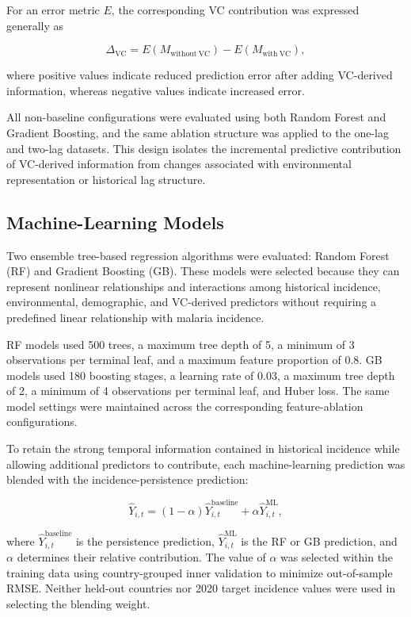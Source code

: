 \documentclass[10pt,twocolumn]{article}
\begin{document}
For an error metric \(E\), the corresponding VC contribution was
expressed generally as

\begin{equation}
\Delta_{\mathrm{VC}}
=
E(M_{\mathrm{without\ VC}})
-
E(M_{\mathrm{with\ VC}}),
\label{eq:vc_increment}
\end{equation}

where positive values indicate reduced prediction error after adding
VC-derived information, whereas negative values indicate increased
error.

All non-baseline configurations were evaluated using both Random
Forest and Gradient Boosting, and the same ablation structure was
applied to the one-lag and two-lag datasets. This design isolates the
incremental predictive contribution of VC-derived information from
changes associated with environmental representation or historical
lag structure.

\subsection{Machine-Learning Models}

Two ensemble tree-based regression algorithms were evaluated: Random
Forest (RF) and Gradient Boosting (GB). These models were selected
because they can represent nonlinear relationships and interactions
among historical incidence, environmental, demographic, and VC-derived
predictors without requiring a predefined linear relationship with
malaria incidence.

RF models used 500 trees, a maximum tree depth of 5, a minimum of 3
observations per terminal leaf, and a maximum feature proportion of
0.8. GB models used 180 boosting stages, a learning rate of 0.03, a
maximum tree depth of 2, a minimum of 4 observations per terminal leaf,
and Huber loss. The same model settings were maintained across the
corresponding feature-ablation configurations.

To retain the strong temporal information contained in historical
incidence while allowing additional predictors to contribute, each
machine-learning prediction was blended with the incidence-persistence
prediction:

\begin{equation}
\hat{Y}_{i,t}
=
(1-\alpha)\hat{Y}^{\mathrm{baseline}}_{i,t}
+
\alpha\hat{Y}^{\mathrm{ML}}_{i,t},
\label{eq:prediction_blending}
\end{equation}

where \(\hat{Y}^{\mathrm{baseline}}_{i,t}\) is the persistence
prediction, \(\hat{Y}^{\mathrm{ML}}_{i,t}\) is the RF or GB prediction,
and \(\alpha\) determines their relative contribution. The value of
\(\alpha\) was selected within the training data using
country-grouped inner validation to minimize out-of-sample RMSE.
Neither held-out countries nor 2020 target incidence values were used
in selecting the blending weight.
\end{document}
